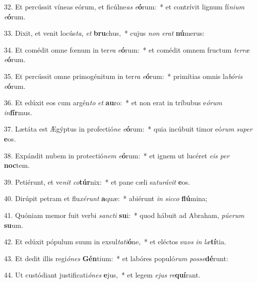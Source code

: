 32. Et percússit víneas eórum, et ficúlne\textit{as} \textit{e}\textbf{ó}rum:~*  et contrívit lignum fí\textit{ni}\textit{um} \textit{e}\textbf{ó}rum.\

33. Dixit, et venit locús\textit{ta}, \textit{et} \textbf{bru}chus,~*  cujus \textit{non} \textit{e}\textit{rat} \textbf{nú}merus:\

34. Et comédit omne fœnum in ter\textit{ra} \textit{e}\textbf{ó}rum:~*  et comédit omnem fructum \textit{ter}\textit{ræ} \textit{e}\textbf{ó}rum.\

35. Et percússit omne primogénitum in ter\textit{ra} \textit{e}\textbf{ó}rum:~*  primítias omnis la\textit{bó}\textit{ris} \textit{e}\textbf{ó}rum.\

36. Et edúxit eos cum argén\textit{to} \textit{et} \textbf{au}ro:~*  et non erat in tríbubus e\textit{ó}\textit{rum} \textit{in}\textbf{fír}mus.\

37. Lætáta est Ægýptus in profectió\textit{ne} \textit{e}\textbf{ó}rum:~*  quia incúbuit timor eó\textit{rum} \textit{su}\textit{per} \textbf{e}os.\

38. Expándit nubem in protectió\textit{nem} \textit{e}\textbf{ó}rum:~*  et ignem ut lucéret \textit{e}\textit{is} \textit{per} \textbf{noc}tem.\

39. Petiérunt, et ve\textit{nit} \textit{co}\textbf{túr}nix:~*  et pane cæli sa\textit{tu}\textit{rá}\textit{vit} \textbf{e}os.\

40. Dirúpit petram et flu\textit{xé}\textit{runt} \textbf{a}quæ:~*  abiérunt \textit{in} \textit{sic}\textit{co} \textbf{flú}mina;\

41. Quóniam memor fuit verbi \textit{sanc}\textit{ti} \textbf{su}i:~*  quod hábuit ad Abraham, \textit{pú}\textit{e}\textit{rum} \textbf{su}um.\

42. Et edúxit pópulum suum in exsul\textit{ta}\textit{ti}\textbf{ó}ne,~*  et eléctos su\textit{os} \textit{in} \textit{læ}\textbf{tí}tia.\

43. Et dedit illis regi\textit{ó}\textit{nes} \textbf{Gén}tium:~*  et labóres populó\textit{rum} \textit{pos}\textit{se}\textbf{dé}runt:\

44. Ut custódiant justificati\textit{ó}\textit{nes} \textbf{e}jus,~*  et legem \textit{e}\textit{jus} \textit{re}\textbf{quí}rant.\

